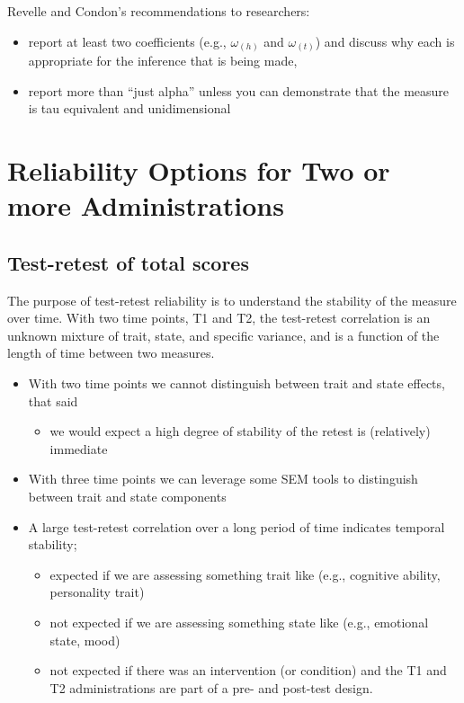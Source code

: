 \documentclass[
  english,
]{book}
\providecommand{\tightlist}{%
  \setlength{\itemsep}{0pt}\setlength{\parskip}{0pt}}
\begin{document}
Revelle and Condon's \citep{revelle_reliability_2019} recommendations to researchers:

\begin{itemize}
\tightlist
\item
  report at least two coefficients (e.g., \(\omega_{(h)}\) and \(\omega_{(t)}\)) and discuss why each is appropriate for the inference that is being made,
\item
  report more than ``just alpha'' unless you can demonstrate that the measure is tau equivalent and unidimensional
\end{itemize}

\hypertarget{reliability-options-for-two-or-more-administrations}{%
\section{Reliability Options for Two or more Administrations}\label{reliability-options-for-two-or-more-administrations}}

\hypertarget{test-retest-of-total-scores}{%
\subsection{Test-retest of total scores}\label{test-retest-of-total-scores}}

The purpose of test-retest reliability is to understand the stability of the measure over time. With two time points, T1 and T2, the test-retest correlation is an unknown mixture of trait, state, and specific variance, and is a function of the length of time between two measures.

\begin{itemize}
\tightlist
\item
  With two time points we cannot distinguish between trait and state effects, that said

  \begin{itemize}
  \tightlist
  \item
    we would expect a high degree of stability of the retest is (relatively) immediate
  \end{itemize}
\item
  With three time points we can leverage some SEM tools to distinguish between trait and state components
\item
  A large test-retest correlation over a long period of time indicates temporal stability;

  \begin{itemize}
  \tightlist
  \item
    expected if we are assessing something trait like (e.g., cognitive ability, personality trait)
  \item
    not expected if we are assessing something state like (e.g., emotional state, mood)
  \item
    not expected if there was an intervention (or condition) and the T1 and T2 administrations are part of a pre- and post-test design.
  \end{itemize}
\end{itemize}
\end{document}
